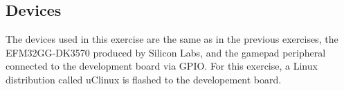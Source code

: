 \subsection{Devices}
The devices used in this exercise are the same as in the previous exercises, the EFM32GG-DK3570 produced by Silicon Labs, and the gamepad peripheral connected to the development board via GPIO.
For this exercise, a Linux distribution called uClinux is flashed to the developement board.
